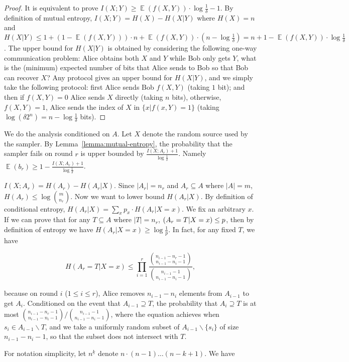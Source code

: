 \documentclass[10pt]{article}
\DeclareMathOperator*{\E}{\mathbb{E}}
\let\Pr\relax
\DeclareMathOperator*{\Pr}{\mathbb{P}}
\begin{document}
\begin{proof}
  It is equivalent to prove $I(X;Y)\ge \E(f(X,Y))\cdot \log\frac{1}{\delta}-1$. By definition of mutual entropy, $I(X;Y)=H(X)-H(X|Y)$ where $H(X)=n$ and $H(X|Y)\le 1+(1-\E(f(X,Y)))\cdot n+\E(f(X,Y))\cdot (n-\log\frac{1}{\delta})=n+1-\E(f(X,Y))\cdot \log\frac{1}{\delta}$.
  The upper bound for $H(X|Y)$ is obtained by considering the following one-way communication problem: Alice obtains both $X$ and $Y$ while Bob only gets $Y$, what is the (minimum) expected number of bits that Alice sends to Bob so that Bob can recover $X$? Any protocol gives an upper bound for $H(X|Y)$, and we simply take the following protocol: first Alice sends Bob $f(X,Y)$ (taking $1$ bit); and then if $f(X,Y)=0$ Alice sends $X$ directly (taking $n$ bits), otherwise, $f(X,Y)=1$, Alice sends the index of $X$ in $\{x|f(x,Y)=1\}$ (taking $\log (\delta 2^n)=n-\log\frac{1}{\delta}$ bits).  
\end{proof}

We do the analysis conditioned on $A$. Let $X$ denote the random source used by the sampler. By Lemma~\ref{lemma:mutual-entropy}, the probability that the sampler fails on round $r$ is upper bounded by $\frac{I(X;A_r)+1}{\log \frac{1}{\delta}}$. Namely $\E(b_r)\ge 1-\frac{I(X;A_r)+1}{\log \frac{1}{\delta}}$. 

$I(X;A_r)=H(A_r)-H(A_r|X)$. Since $|A_r|=n_r$ and $A_r\subseteq A$ where $|A|=m$, $H(A_r)\le \log {m \choose n_r}$. Now we want to lower bound $H(A_r|X)$. By definition of conditional entropy, $H(A_r|X)=\sum_x{p_x\cdot H(A_r|X=x)}$. We fix an arbitrary $x$. If we can prove that for any $T\subseteq A$ where $|T|=n_r$, $\Pr(A_r=T|X=x)\le p$, then by definition of entropy we have $H(A_r|X=x)\ge\log\frac{1}{p}$. In fact, for any fixed $T$, we have

$$H(A_r=T|X=x)\le \prod_{i=1}^{r}{\frac{{n_{i-1}-n_r-1 \choose n_{i-1}-n_i-1}}{{n_{i-1}-1 \choose n_{i-1}-n_i-1}}},$$

because on round $i$ ($1\le i \le r$), Alice removes $n_{i-1}-n_i$ elements from $A_{i-1}$ to get $A_i$. Conditioned on the event that $A_{i-1}\supseteq T$, the probability that $A_i\supseteq T$ is at most ${{n_{i-1}-n_r-1 \choose n_{i-1}-n_i-1}}/{{n_{i-1}-1 \choose n_{i-1}-n_i-1}}$, where the equation achieves when $s_i\in A_{i-1}\backslash T$, and we take a uniformly random subset of $A_{i-1}\backslash \{s_i\}$ of size $n_{i-1}-n_i-1$, so that the subset does not intersect with $T$.

For notation simplicity, let $n^{\underline{k}}$ denote $n\cdot (n-1)  \ldots (n-k+1)$. We have 
\end{document}
